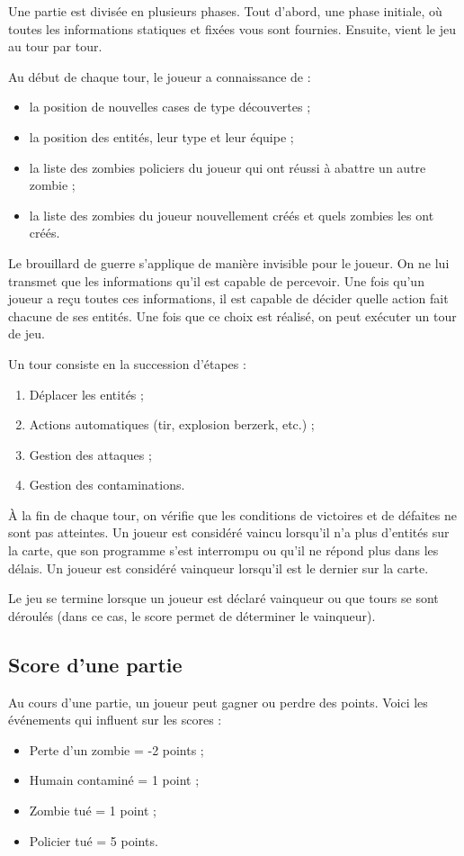 Une partie est divisée en plusieurs phases.
Tout d'abord, une phase initiale, où toutes les informations statiques et fixées vous sont fournies.
Ensuite, vient le jeu au tour par tour.

Au début de chaque tour, le joueur a connaissance de :
\begin{itemize}
    \item la position de nouvelles cases de type \water{} découvertes ;
    \item la position des entités, leur type et leur équipe ;
    \item la liste des zombies policiers du joueur qui ont réussi à abattre un autre zombie ;
    \item la liste des zombies du joueur nouvellement créés et quels zombies les ont créés.
\end{itemize}

Le brouillard de guerre s'applique de manière invisible pour le joueur.
On ne lui transmet que les informations qu'il est capable de percevoir.
Une fois qu'un joueur a reçu toutes ces informations, il est capable de décider quelle action fait chacune de ses entités.
Une fois que ce choix est réalisé, on peut exécuter un tour de jeu.


Un tour consiste en la succession d'étapes :

\begin{enumerate}
    \item Déplacer les entités ;
    \item Actions automatiques (tir, explosion berzerk, etc.) ;
    \item Gestion des attaques ;
    \item Gestion des contaminations.
\end{enumerate}

À la fin de chaque tour, on vérifie que les conditions de victoires et de défaites ne sont pas atteintes.
Un joueur est considéré vaincu lorsqu'il n'a plus d'entités sur la carte, que son programme s'est interrompu ou qu'il ne répond plus dans les délais.
Un joueur est considéré vainqueur lorsqu'il est le dernier sur la carte.

Le jeu se termine lorsque un joueur est déclaré vainqueur ou que \turnmax{} tours se sont déroulés (dans ce cas, le score permet de déterminer le vainqueur).


\subsection{Score d'une partie} %
Au cours d'une partie, un joueur peut gagner ou perdre des points.
Voici les événements qui influent sur les scores :
\begin{itemize}
    \item Perte d'un zombie = -2 points ;
    \item Humain contaminé = 1 point ;
    \item Zombie tué = 1 point ;
    \item Policier tué = 5 points.
\end{itemize}

